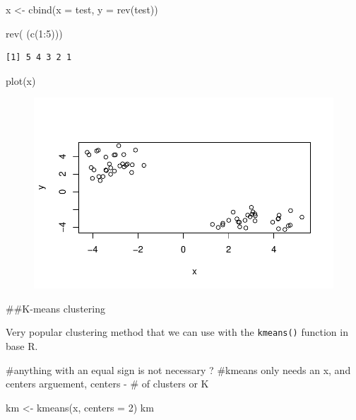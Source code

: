 \documentclass[
  letterpaper,
  DIV=11,
  numbers=noendperiod]{scrartcl}
\newenvironment{Shaded}{\begin{snugshade}}{\end{snugshade}}
\newcommand{\AttributeTok}[1]{\textcolor[rgb]{0.40,0.45,0.13}{#1}}
\newcommand{\CommentTok}[1]{\textcolor[rgb]{0.37,0.37,0.37}{#1}}
\newcommand{\DecValTok}[1]{\textcolor[rgb]{0.68,0.00,0.00}{#1}}
\newcommand{\FunctionTok}[1]{\textcolor[rgb]{0.28,0.35,0.67}{#1}}
\newcommand{\NormalTok}[1]{\textcolor[rgb]{0.00,0.23,0.31}{#1}}
\newcommand{\OtherTok}[1]{\textcolor[rgb]{0.00,0.23,0.31}{#1}}
\newcommand{\SpecialCharTok}[1]{\textcolor[rgb]{0.37,0.37,0.37}{#1}}
\begin{document}
\begin{Shaded}
\begin{Highlighting}[]
\NormalTok{x }\OtherTok{\textless{}{-}} \FunctionTok{cbind}\NormalTok{(}\AttributeTok{x =}\NormalTok{ test, }\AttributeTok{y =} \FunctionTok{rev}\NormalTok{(test))}

\FunctionTok{rev}\NormalTok{( (}\FunctionTok{c}\NormalTok{(}\DecValTok{1}\SpecialCharTok{:}\DecValTok{5}\NormalTok{)))}
\end{Highlighting}
\end{Shaded}

\begin{verbatim}
[1] 5 4 3 2 1
\end{verbatim}

\begin{Shaded}
\begin{Highlighting}[]
\FunctionTok{plot}\NormalTok{(x)}
\end{Highlighting}
\end{Shaded}

\begin{figure}[H]

{\centering \includegraphics{Class07_files/figure-pdf/unnamed-chunk-3-1.pdf}

}

\end{figure}

\#\#K-means clustering

Very popular clustering method that we can use with the
\texttt{kmeans()} function in base R.

\begin{Shaded}
\begin{Highlighting}[]
\CommentTok{\#anything with an equal sign is not necessary ?}
\CommentTok{\#kmeans only needs an x, and centers arguement, centers {-} \# of clusters or \textquotesingle{}K\textquotesingle{}}

\NormalTok{km }\OtherTok{\textless{}{-}} \FunctionTok{kmeans}\NormalTok{(x, }\AttributeTok{centers =} \DecValTok{2}\NormalTok{)}
\NormalTok{km}
\end{Highlighting}
\end{Shaded}
\end{document}
